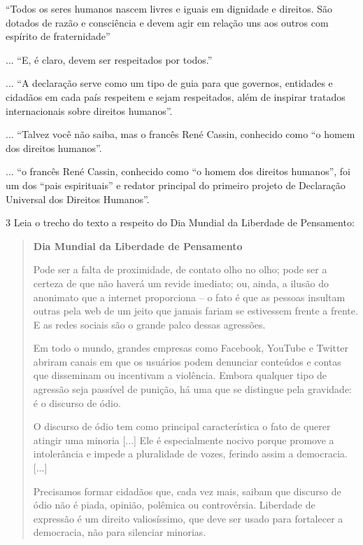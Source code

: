 \begin{escolha}
\begin{escolha}
\begin{escolha}
{\begin{boxlist}
\boxitem[\rosa{F}] ``Todos os seres humanos nascem livres e iguais em
dignidade e direitos. São dotados de razão e consciência e devem agir 
em relação uns aos outros com espírito de fraternidade''

\boxitem[\rosa{O}] ... ``E, é claro, devem ser respeitados por todos.''

\boxitem[\rosa{O}] ... ``A declaração serve como um tipo de guia para que
governos, entidades e cidadãos em cada país respeitem e sejam respeitados,
além de inspirar tratados internacionais sobre direitos humanos''.

\boxitem[\rosa{O}] ... ``Talvez você não saiba, mas o francês René Cassin,
conhecido como ``o homem dos direitos humanos''.

\boxitem[\rosa{F}] ... ``o francês René Cassin, conhecido como ``o homem 
dos direitos humanos'', foi um dos ``pais espirituais'' e redator principal do
primeiro projeto de Declaração Universal dos Direitos Humanos''.
\end{boxlist}

\num{3} Leia o trecho do texto a respeito do Dia Mundial da Liberdade de
Pensamento:

\begin{quote}
\textbf{Dia Mundial da Liberdade de Pensamento}

Pode ser a falta de proximidade, de contato olho no olho; pode ser a
certeza de que não haverá um revide imediato; ou, ainda, a ilusão do
anonimato que a internet proporciona -- o fato é que as pessoas insultam
outras pela web de um jeito que jamais fariam se estivessem frente a
frente. E as redes sociais são o grande palco dessas agressões.

Em todo o mundo, grandes empresas como Facebook, YouTube e Twitter
abriram canais em que os usuários podem denunciar conteúdos e contas que
disseminam ou incentivam a violência. Embora qualquer tipo de agressão
seja passível de punição, há uma que se distingue pela gravidade: é o
discurso de ódio.

O discurso de ódio tem como principal característica o fato de querer
atingir uma minoria {[}...{]} Ele é especialmente nocivo porque promove
a intolerância e impede a pluralidade de vozes, ferindo assim
a democracia. {[}...{]}

Precisamos formar cidadãos que, cada vez mais, saibam que discurso de
ódio não é piada, opinião, polêmica ou controvérsia. Liberdade de
expressão é um direito valiosíssimo, que deve ser usado para fortalecer
a democracia, não para silenciar minorias.


\end{quote}}
\end{escolha}
\end{escolha}
\end{escolha}
